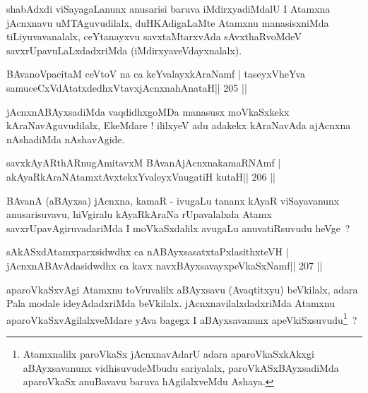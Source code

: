 \begin{artha}
shabAdxdi viSayagaLanunx anusarisi baruva iMdirxyadiMdalU I Atamxna jAcnxnavu uMTAguvudilalx, duHKAdigaLaMte Atamxnu manasisxniMda tiLiyuvavanalalx, ceYtanayxvu savxtaMtarxvAda sAvxthaRvoMdeV savxrUpavuLaLxdadxriMda (iMdirxyaveVdayxnalalx).
\end{artha}


\begin{shl}
BAvanoVpacitaM ceVtoV na ca keYvalayxkAraNamf |
taseyxVheYva samuceCxVdAtatxdedhxVtavxjAcnxnahAnataH\hfill || 205 ||
\end{shl}

\begin{artha}
jAcnxnABAyxsadiMda vaqdidhxgoMDa manasusx moVkaSxkekx kAraNavAguvudilalx, EkeMdare ! ililxyeV adu adakekx kAraNavAda ajAcnxna nAshadiMda nAshavAgide.
\end{artha}

\begin{shl}
savxkAyARthARnugAmitavxM BAvanAjAcnxnakamaRNAmf |
akAyaRkAraNAtamxtAvxtekxYvaleyxV\s nugatiH kutaH\hfill || 206 ||
\end{shl}

\begin{artha}
BAvanA (aBAyxsa) jAcnxna, kamaR - ivugaLu tananx kAyaR viSayavanunx anusarisuvavu, hiVgiralu kAyaRkAraNa rUpavalalxda Atamx savxrUpavAgiruvadariMda I moVkaSxdalilx avugaLu anuvatiRsuvudu heVge~?
\end{artha}

\begin{shl}
sAkASxdAtamxparxsidwdhx ca nABAyxsasatxtaPxlasithxteVH |
jAcnxnABAvAdasidwdhx ca kavx navxBAyxsavayxpeVkaSxNamf\hfill || 207 ||
\end{shl}

\begin{artha}
aparoVkaSxvAgi Atamxnu toVruvalilx aBAyxsavu (Avaqtitxyu) beVkilalx, adara Pala modale ideyAdadxriMda beVkilalx. jAcnxnavilalxdadxriMda Atamxnu aparoVkaSxvAgilalxveMdare yAva bagegx I aBAyxsavanunx apeVkiSxsuvudu\footnote{Atamxnalilx paroVkaSx jAcnxnavAdarU adara aparoVkaSxkAkxgi aBAyxsavanunx vidhisuvudeMbudu sariyalalx, paroVkASxBAyxsadiMda aparoVkaSx anuBavavu baruva hAgilalxveMdu Ashaya.}~?
\end{artha}



